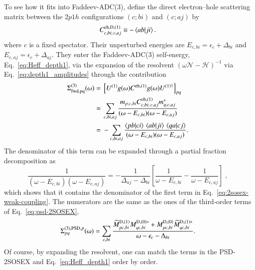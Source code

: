 \documentclass[aip,jcp,reprint,noshowkeys,superscriptaddress]{revtex4-1}
\newcommand{\eps}{\epsilon}
\begin{document}
To see how 
it fits into Faddeev-ADC(3), define the direct electron--hole scattering
matrix between the $2p1h$ configurations $(c;bi)$ and $(c;aj)$ by
\begin{equation}
    C^{{\rm eh},{\rm D},(1)}_{c,bi;\,c,aj}
    \equiv
    -\braket{ab}{ji}.
    \label{eq:direct-eh-interaction}
\end{equation}
where $c$ is a fixed spectator. Their unperturbed energies are
$E_{c,bi}=\epsilon_c+\Delta_{bi}$ and $E_{c,aj}=\epsilon_c+\Delta_{aj}$.
They enter the Faddeev-ADC(3) self-energy, Eq.~\eqref{eq:Heff_depth1}, via 
the expansion of the resolvent $(\omega\mathcal{N} - \mathcal{H})^{-1}$ via 
Eq.~\eqref{eq:depth1_amplitudes} through the contribution
\begin{equation}
    \begin{aligned}
    \Sigma^{(3)}_{\rm fwd,pq}(\omega)
    ={}&
    \left[
        U^{(1)}g(\omega)C^{{\rm eh},(1)}
        g(\omega)U^{(1)\dagger}
    \right]_{pq}
    \\
    ={}&
    \sum_{c,bi,aj}
    \frac{
        m_{p;c,bi}
        C^{{\rm eh},(1)}_{c,bi;\,c,aj}
        m_{q;c,aj}^{*}
    }
    {(\omega-E_{c,bi})(\omega-E_{c,aj})}
    \\
    ={}&
    -\sum_{c,bi,aj}
    \frac{
        \braket{pb}{ci}\,
        \braket{ab}{ji}\,
        \braket{qa}{cj}
    }
    {(\omega-E_{c,bi})(\omega-E_{c,aj})}.
    \end{aligned}
    \label{eq:adc3-forward-eh-insertion}
\end{equation}
The denominator of this term can be expanded through a partial 
fraction decomposition as 
\begin{equation}
    \frac{1}
    {(\omega-E_{c,bi})(\omega-E_{c,aj})}  
    =
    -\frac{1}{\Delta_{aj}-\Delta_{bi}}
    \left[
        \frac{1}{\omega-E_{c,bi}}
        -
        \frac{1}{\omega-E_{c,aj}}
    \right] \;,
    \label{eq:forward-eh-partial-fraction}
\end{equation}
which shows that it contains
the denominator of the first term in Eq.~\eqref{eq:2sosex-weak-coupling}.
The numerators are the same as the ones of the 
third-order terms of Eq.~\eqref{eq:psd-2SOSEX},
\begin{equation}
    \Sigma_{pq}^{(3),{\rm PSD},p}(\omega)
    =
    \sum_{c,bi}
    \frac{
        \widetilde M_{pc,bi}^{\rm D,(1)}
        M_{qc,bi}^{\rm D,(0)*}
        +
        M_{pc,bi}^{\rm D,(0)}
        \widetilde M_{qc,bi}^{\rm D,(1)*}
    }
    {
        \omega-\eps_c-\Delta_{bi}
    }.
    \label{eq:PSD-third-order-cross-term}
\end{equation}
Of course, by expanding the 
resolvent, one can match the terms in the PSD-2SOSEX and 
Eq.~\eqref{eq:Heff_depth1} order by order. 
\end{document}
